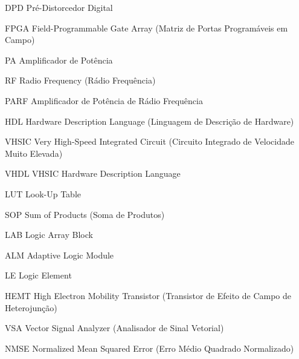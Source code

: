 \documentclass[
	12pt,				%
	openright,			%
	oneside,			%
	a4paper,			%
	brazil				%
	]{abntex2}
\begin{document}
\renewcommand{\resumoname}{Abstract} %
\begin{resumo}
    
\end{resumo}
\renewcommand{\resumoname}{Resumo}
\begin{siglas}
	\item[DPD] Pré-Distorcedor Digital
	\item[FPGA] Field-Programmable Gate Array (Matriz de Portas Programáveis em Campo)
	\item[PA] Amplificador de Potência
	\item[RF] Radio Frequency (Rádio Frequência)
	\item[PARF] Amplificador de Potência de Rádio Frequência
	\item[HDL] Hardware Description Language (Linguagem de Descrição de Hardware)
	\item[VHSIC] Very High-Speed Integrated Circuit (Circuito Integrado de Velocidade Muito Elevada)
	\item[VHDL] VHSIC Hardware Description Language
	\item[LUT] Look-Up Table
	\item[SOP] Sum of Products (Soma de Produtos)
	\item[LAB] Logic Array Block
	\item[ALM] Adaptive Logic Module
	\item[LE] Logic Element
	\item[HEMT] High Electron Mobility Transistor (Transistor de Efeito de Campo de Heterojunção)
	\item[VSA] Vector Signal Analyzer (Analisador de Sinal Vetorial)
	\item[NMSE] Normalized Mean Squared Error (Erro Médio Quadrado Normalizado)
\end{siglas}





	
\listoffigures*
\cleardoublepage{\tiny }
\listoftables*
\cleardoublepage
\tableofcontents*
\cleardoublepage


\end{document}
